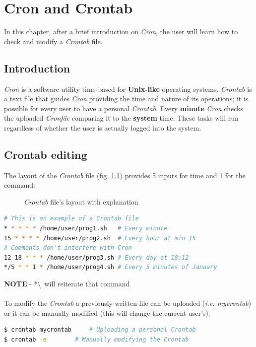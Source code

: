 \documentclass[12pt,a4paper]{report}
\begin{document}
\chapter{Cron and Crontab} \label{cron}
%
In this chapter, after a brief introduction on \textit{Cron}, the user will learn how to check and modify a \textit{Crontab} file.
\section{Introduction}
\textit{Cron} is a software utility time-based for \textbf{Unix-like} operating systems. \textit{Crontab} is a text file that guides \textit{Cron} providing the time and nature of its operations; it is possible for every user to have a personal \textit{Crontab}. Every \textbf{minute} \textit{Cron} checks the uploaded \textit{Cronfile} comparing it to the \textbf{system} time. These tasks will run regardless of whether the user is actually logged into the system.
\section{Crontab editing}
The layout of the \textit{Crontab} file (fig. \ref{crnlay}) provides 5 inputs for time and 1 for the command:
\begin{figure}[h!]
\centering
{}
\caption{\textit{Crontab} file's layout with explanation}
\label{crnlay}
\end{figure}
\begin{lstlisting}[language=bash]
# This is an example of a Crontab file
* * * * * /home/user/prog1.sh	# Every minute
15 * * * * /home/user/prog2.sh	# Every hour at min 15
# Comments don't interfere with Cron
12 18 * * * /home/user/prog3.sh	# Every day at 18:12
*/5 * * 1 * /home/user/prog4.sh	# Every 5 minutes of January
\end{lstlisting} 
\textbf{NOTE} - *\textbackslash \ will reiterate that command \\ \\
To modify the \textit{Crontab} a previously written file can be uploaded (\textit{i.e. mycrontab}) or it can be manually modified (this will change the current user's). \\
\begin{lstlisting}[language=bash]
$ crontab mycrontab 	# Uploading a personal Crontab
$ crontab -e	 	# Manually modifying the Crontab
\end{lstlisting}
\end{document}
